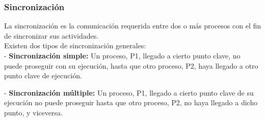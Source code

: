 \documentclass[spanish, 12pt]{article}
\begin{document}
				\newpage
				
				\subsubsection{Sincronización}
				
					La sincronización es la comunicación requerida entre dos o más procesos con el fin de sincronizar sus actividades.\\
				
					Existen dos tipos de sincronización generales:\\
					
					- \textbf{Sincronización simple:} Un proceso, P1, llegado a cierto punto clave, no puede proseguir con su ejecución, hasta que otro proceso, P2, haya llegado a otro punto clave de ejecución.\\
					
					\begin{figure}[H]
					\centerline{}
					\end{figure}
					
					- \textbf{Sincronización múltiple:} Un proceso, P1, llegado a cierto punto clave de su ejecución no puede proseguir hasta que otro proceso, P2, no haya llegado a dicho punto, y viceversa.\\
					
					\begin{figure}[H]
					\centerline{}
					\end{figure}
			
					\newpage
					
\end{document}
